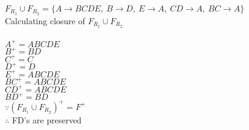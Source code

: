 \documentclass[12pt]{article}
\begin{document}
$F_{R_1} \cup F_{R_2} = \{A \rightarrow BCDE,\ B \rightarrow D,\ E \rightarrow A,\ CD \rightarrow A,\ BC \rightarrow A\}$\\

Calculating closure of $F_{R_1} \cup F_{R_2}$\\\\

$A^+ =ABCDE$\\
${B}^+=BD$\\
${C}^+=C$\\
${D}^+=D$\\
${E}^+=ABCDE$\\
${BC}^+= ABCDE$\\
${CD}^+= ABCDE$\\
${BD}^+=BD$\\

$\because (F_{R_1} \cup F_{R_2})^+ = F^+$\\
$\therefore$ FD's are preserved\\








\end{document}
